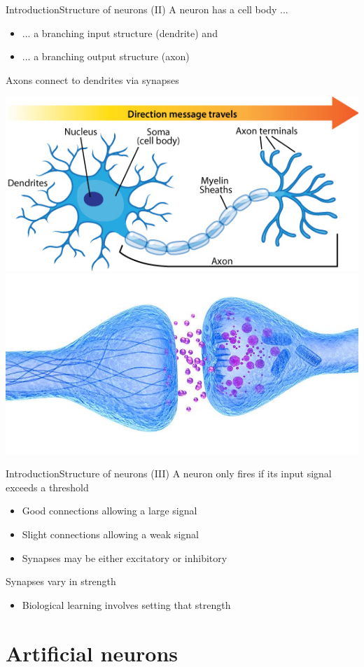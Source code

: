 \documentclass[10pt,compress]{beamer} %
\begin{document}
\begin{frame}{Introduction}{Structure of neurons (II)}
		A neuron has a cell body ...
			\begin{itemize}
			\item ... a branching input structure (dendrite) and 
			\item ... a branching output structure (axon)
			\end{itemize}
		Axons connect to dendrites via \alert{synapses}
		\smallskip
		\begin{center}
			\includegraphics[width=0.6\linewidth]{figs/neuron_anatomy.jpg}
			\includegraphics[width=0.4\linewidth]{figs/sinapsis.jpg}
		\end{center}
\end{frame}

\begin{frame}{Introduction}{Structure of neurons (III)}
	A neuron only fires if its input signal exceeds a threshold
	\begin{itemize}
	\item Good connections allowing a large signal
	\item Slight connections allowing a weak signal
	\item Synapses may be either excitatory or inhibitory
	\end{itemize}
	Synapses vary in strength
	\begin{itemize}
		\item Biological learning involves setting that strength
	\end{itemize}
\end{frame}

\section{Artificial neurons}
\end{document}
